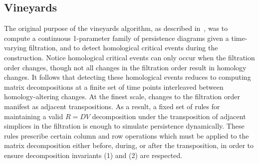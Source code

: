 \documentclass{siamart190516}
\begin{document}
\subsection{Vineyards}\label{sec:vineyards}
The original purpose of the vineyards algorithm, as described in~\cite{cohen2006vines}, was to compute a continuous 1-parameter family of persistence diagrams given a time-varying filtration, and to detect homological critical events during the construction.
Notice homological critical events can only occur when the filtration order changes, though not all changes in the filtration order result in homology changes.
It follows that detecting these homological events reduces to computing matrix decompositions at a finite set of time points interleaved between homology-altering changes. 
At the finest scale, changes to the filtration order manifest as adjacent transpositions. 
As a result, a fixed set of rules for maintaining a valid $R = D V$ decomposition under the transposition of adjacent simplices in the filtration is enough to simulate persistence dynamically. 
These rules prescribe certain column and row operations which must be applied to the matrix decomposition either before, during, or after the transposition, in order to ensure decomposition invariants (1) and (2) are respected.   
\end{document}
